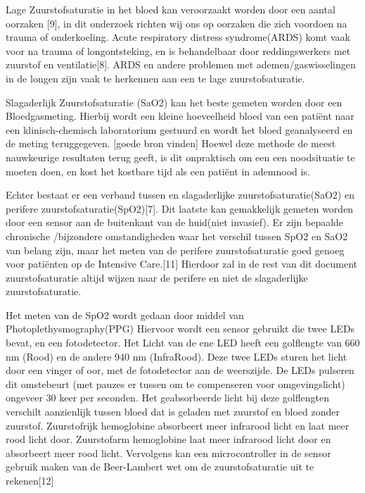 \documentclass[11pt]{article}
\begin{document}
    Lage Zuurstofsaturatie in het bloed kan veroorzaakt worden door een aantal oorzaken [9], in dit onderzoek richten wij ons op oorzaken die zich voordoen na trauma of onderkoeling.
    Acute respiratory distress syndrome(ARDS) komt vaak voor na trauma of longontsteking, en is behandelbaar door reddingswerkers met zuurstof en ventilatie[8]. 
    ARDS en andere problemen met ademen/gaswisselingen in de longen zijn vaak te herkennen aan een te lage zuurstofsaturatie.

    Slagaderlijk Zuurstofsaturatie (SaO2) kan het beste gemeten worden door een Bloedgasmeting. 
    Hierbij wordt een kleine hoeveelheid bloed van een patiënt naar een klinisch-chemisch laboratorium gestuurd en wordt het bloed geanalyseerd en de meting teruggegeven. 
    [goede bron vinden] Hoewel deze methode de meest nauwkeurige resultaten terug geeft, is dit onpraktisch om een een noodsituatie  te moeten doen, en kost het kostbare tijd als een patiënt in ademnood is.

    Echter bestaat er een verband tussen en slagaderlijke zuurstofsaturatie(SaO2) en perifere zuurstofsaturatie(SpO2)[7]. 
    Dit laatste kan gemakkelijk gemeten worden door een sensor aan de buitenkant van de huid(niet invasief). 
    Er zijn bepaalde chronische /bijzondere omstandigheden waar het verschil tussen SpO2 en SaO2 van belang zijn, maar het meten van de perifere zuurstofsaturatie goed genoeg voor patiënten op de Intensive Care.[11] 
    Hierdoor zal in de rest van dit document zuurstofsaturatie altijd wijzen naar de perifere en niet de slagaderlijke zuurstofsaturatie.

    Het meten van de SpO2 wordt gedaan door middel van Photoplethysmography(PPG) Hiervoor wordt een sensor gebruikt die twee LEDs bevat, en een fotodetector. 
    Het Licht van de ene LED heeft een golflengte van 660 nm (Rood) en de andere 940 nm (InfraRood). Deze twee LEDs sturen het licht door een vinger of oor, met de fotodetector aan de weerszijde. 
    De LEDs pulseren dit omstebeurt (met pauzes er tussen om te compenseren voor omgevingslicht) ongeveer 30 keer per seconden. 
    Het geabsorbeerde licht bij deze golflengten verschilt aanzienlijk tussen bloed dat is geladen met zuurstof en bloed zonder zuurstof. 
    Zuurstofrijk hemoglobine absorbeert meer infrarood licht en laat meer rood licht door. Zuurstofarm hemoglobine laat meer infrarood licht door en absorbeert meer rood licht. 
    Vervolgens kan een microcontroller in de sensor gebruik maken van de Beer-Lambert wet om de zuurstofsaturatie uit te rekenen[12]
\end{document}
